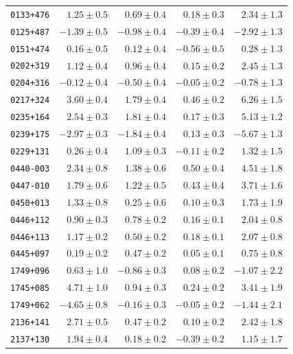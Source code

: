 \begin{table}
\begin{SingleSpace}
\begin{tabular}{crrrr}
        \texttt{0133+476} & $1.25\pm 0.5$ & $0.69\pm 0.4$ & $0.18\pm 0.3$ & $2.34 \pm 1.3$ \\
        \texttt{0125+487} & $-1.39\pm 0.5$ & $-0.98\pm 0.4$ & $-0.39\pm 0.4$ & $-2.92 \pm 1.3$ \\
        \texttt{0151+474} & $0.16\pm 0.5$ & $0.12\pm 0.4$ & $-0.56\pm 0.5$ & $0.28 \pm 1.3$ \\
        \texttt{0202+319} & $1.12\pm 0.4$ & $0.96\pm 0.4$ & $0.15\pm 0.2$ & $2.45 \pm 1.3$ \\
        \texttt{0204+316} & $-0.12\pm 0.4$ & $-0.50\pm 0.4$ & $-0.05\pm 0.2$ & $-0.78 \pm 1.3$ \\
        \texttt{0217+324} & $3.60\pm 0.4$ & $1.79\pm 0.4$ & $0.46\pm 0.2$ & $6.26 \pm 1.5$ \\
        \texttt{0235+164} & $2.54\pm 0.3$ & $1.81\pm 0.4$ & $0.17\pm 0.3$ & $5.13 \pm 1.2$ \\
        \texttt{0239+175} & $-2.97\pm 0.3$ & $-1.84\pm 0.4$ & $0.13\pm 0.3$ & $-5.67 \pm 1.3$ \\
        \texttt{0229+131} & $0.26\pm 0.4$ & $1.09\pm 0.3$ & $-0.11\pm 0.2$ & $1.32 \pm 1.5$ \\
        \texttt{0440-003} & $2.34\pm 0.8$ & $1.38\pm 0.6$ & $0.50\pm 0.4$ & $4.51 \pm 1.8$ \\
        \texttt{0447-010} & $1.79\pm 0.6$ & $1.22\pm 0.5$ & $0.43\pm 0.4$ & $3.71 \pm 1.6$ \\
        \texttt{0450+013} & $1.33\pm 0.8$ & $0.25\pm 0.6$ & $0.10\pm 0.3$ & $1.73 \pm 1.9$ \\
        \texttt{0446+112} & $0.90\pm 0.3$ & $0.78\pm 0.2$ & $0.16\pm 0.1$ & $2.04 \pm 0.8$ \\
        \texttt{0446+113} & $1.17\pm 0.2$ & $0.50\pm 0.2$ & $0.18\pm 0.1$ & $2.07 \pm 0.8$ \\
        \texttt{0445+097} & $0.19\pm 0.2$ & $0.47\pm 0.2$ & $0.05\pm 0.1$ & $0.75 \pm 0.8$ \\
        \texttt{1749+096} & $0.63\pm 1.0$ & $-0.86\pm 0.3$ & $0.08\pm 0.2$ & $-1.07 \pm 2.2$ \\
        \texttt{1745+085} & $4.71\pm 1.0$ & $0.94\pm 0.3$ & $0.24\pm 0.2$ & $3.41 \pm 1.9$ \\
        \texttt{1749+062} & $-4.65\pm 0.8$ & $-0.16\pm 0.3$ & $-0.05\pm 0.2$ & $-1.44 \pm 2.1$ \\
        \texttt{2136+141} & $2.71\pm 0.5$ & $0.47\pm 0.2$ & $0.10\pm 0.2$ & $2.42 \pm 1.8$ \\
        \texttt{2137+130} & $1.94\pm 0.4$ & $0.18\pm 0.2$ & $-0.39\pm 0.2$ & $1.15 \pm 1.7$ \\

\end{tabular}
\end{SingleSpace}
\end{table}
